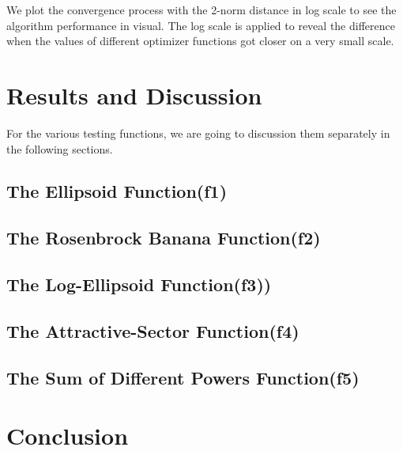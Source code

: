 \documentclass[12pt]{article}
\begin{document}
We plot the convergence process with the 2-norm distance in log scale to see the algorithm performance in visual. The log scale is applied to reveal the difference when the values of different optimizer functions got closer on a very small scale.

\section{Results and Discussion}

For the various testing functions, we are going to discussion them separately in the following sections.

\subsection{The Ellipsoid Function(f1)}

\subsection{The Rosenbrock Banana Function(f2)}

\subsection{The Log-Ellipsoid Function(f3))}

\subsection{The Attractive-Sector Function(f4)}

\subsection{The Sum of Different Powers Function(f5)}



\section{Conclusion}

\end{document}
